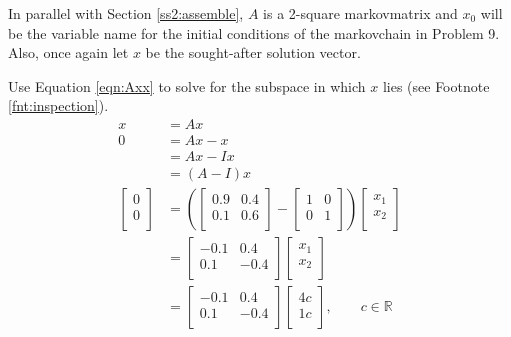 \documentclass[titlepage]{article}
\newcommand{\R}{\mathbb{R}}
\begin{document}
In parallel with Section \ref{ss2:assemble}, $A$ is a 2-square \Gls{markovmatrix} and $x_0$ will be the variable name for the initial conditions of the \Gls{markovchain} in Problem 9. Also, once again let $x$ be the sought-after solution vector.\par
Use Equation \ref{eqn:Axx} to solve for the subspace in which $x$ lies (see Footnote \ref{fnt:inspection}).
\begin{align*}
    x &= Ax\\
    0 &= Ax-x\\
    &= Ax-Ix\\
    &= (A-I)x\\
    \begin{bmatrix}
        0\\
        0\\
    \end{bmatrix}
    &= \left( 
        \begin{bmatrix}
            0.9 & 0.4\\
            0.1 & 0.6\\
        \end{bmatrix}
        -
        \begin{bmatrix}
            1 & 0\\
            0 & 1\\
        \end{bmatrix}
    \right)
    \begin{bmatrix}
        x_1\\
        x_2\\
    \end{bmatrix}\\
    &=
    \begin{bmatrix}
        -0.1 & 0.4\\
        0.1 & -0.4\\
    \end{bmatrix}
    \begin{bmatrix}
        x_1\\
        x_2\\
    \end{bmatrix}\\
    &=
    \begin{bmatrix}
        -0.1 & 0.4\\
        0.1 & -0.4\\
    \end{bmatrix}
    \begin{bmatrix}
        4c\\
        1c\\
    \end{bmatrix}
    ,\qquad c\in\R
\end{align*}
\end{document}
